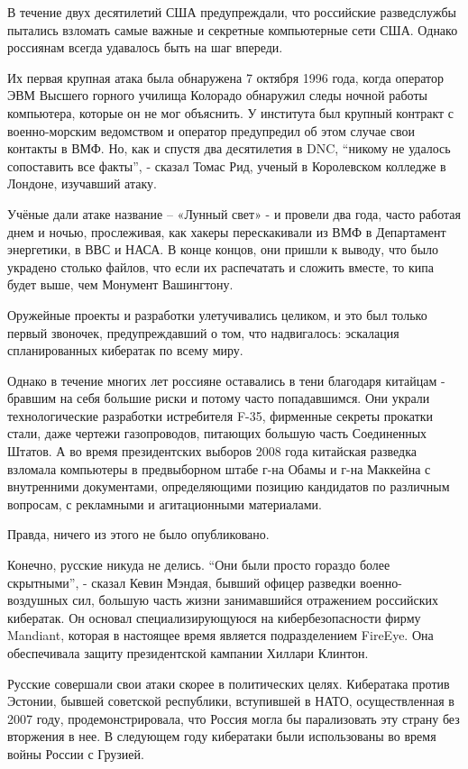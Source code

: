В течение двух десятилетий США предупреждали, что российские
разведслужбы пытались взломать самые важные и секретные компьютерные
сети США. Однако россиянам всегда удавалось быть на шаг впереди.

Их первая крупная атака была обнаружена 7 октября 1996 года, когда
оператор ЭВМ Высшего горного училища Колорадо обнаружил следы ночной
работы компьютера, которые он не мог объяснить. У института был крупный
контракт с военно-морским ведомством и оператор предупредил об этом
случае свои контакты в ВМФ. Но, как и спустя два десятилетия в DNC,
``никому не удалось сопоставить все факты'', - сказал Томас Рид, ученый
в Королевском колледже в Лондоне, изучавший атаку.

Учёные дали атаке название -- «Лунный свет» - и провели два года, часто
работая днем и ночью, прослеживая, как хакеры перескакивали из ВМФ в
Департамент энергетики, в ВВС и НАСА. В конце концов, они пришли к
выводу, что было украдено столько файлов, что если их распечатать и
сложить вместе, то кипа будет выше, чем Монумент Вашингтону.

Оружейные проекты и разработки улетучивались целиком, и это был только
первый звоночек, предупреждавший о том, что надвигалось: эскалация
спланированных кибератак по всему миру.

Однако в течение многих лет россияне оставались в тени благодаря
китайцам - бравшим на себя большие риски и потому часто попадавшимся.
Они украли технологические разработки истребителя F-35, фирменные
секреты прокатки стали, даже чертежи газопроводов, питающих большую
часть Соединенных Штатов. А во время президентских выборов 2008 года
китайская разведка взломала компьютеры в предвыборном штабе г-на Обамы и
г-на Маккейна с внутренними документами, определяющими позицию
кандидатов по различным вопросам, с рекламными и агитационными
материалами.

Правда, ничего из этого не было опубликовано.

Конечно, русские никуда не делись. ``Они были просто гораздо более
скрытными'', - сказал Кевин Мэндая, бывший офицер разведки
военно-воздушных сил, большую часть жизни занимавшийся отражением
российских кибератак. Он основал специализирующуюся на кибербезопасности
фирму Mandiant, которая в настоящее время является подразделением
FireEye. Она обеспечивала защиту президентской кампании Хиллари Клинтон.

Русские совершали свои атаки скорее в политических целях. Кибератака
против Эстонии, бывшей советской республики, вступившей в НАТО,
осуществленная в 2007 году, продемонстрировала, что Россия могла бы
парализовать эту страну без вторжения в нее. В следующем году кибератаки
были использованы во время войны России с Грузией.

